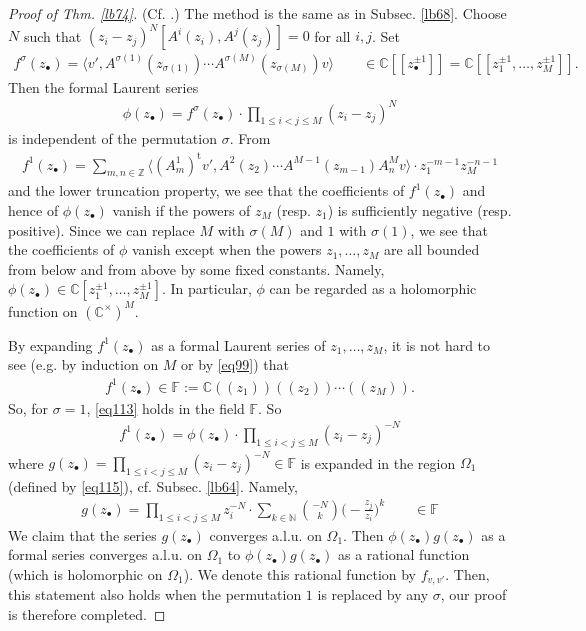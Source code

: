\documentclass[11pt,b5paper,notitlepage]{article}
\theoremstyle{definition}
\theoremstyle{plain}
\newcommand{\tr}{\mathrm{t}} %
\newcommand{\bk}[1]{\langle {#1}\rangle}
\newcommand{\bigbk}[1]{\big\langle {#1}\big\rangle}
\newcommand{\mbb}{\mathbb}
\newcommand{\blt}{\bullet}
\newcommand{\Cbb}{\mathbb C}
\newcommand{\Nbb}{\mathbb N}
\newcommand{\Zbb}{\mathbb Z}
\numberwithin{equation}{section}
\begin{document}
\begin{proof}[Proof of Thm. \ref{lb74}] (Cf. \cite{FHL93}.)
The method is the same as in Subsec. \ref{lb68}. Choose $N$ such that $(z_i-z_j)^N[A^i(z_i),A^j(z_j)]=0$ for all $i,j$. Set
\begin{align}
f^\sigma(z_\blt)=\bigbk{v',A^{\sigma(1)}(z_{\sigma(1)})\cdots A^{\sigma(M)}(z_{\sigma(M)})v}\qquad\in\Cbb[[z_\blt^{\pm1}]]=\Cbb[[z_1^{\pm1},\dots,z_M^{\pm1}]].	
\end{align}
Then the formal Laurent series
\begin{align}
\phi(z_\blt)=f^\sigma(z_\blt)	\cdot \prod_{1\leq i<j\leq M}(z_i-z_j)^N\label{eq113}
\end{align}
is independent of the permutation $\sigma$. From
\begin{align*}
f^1(z_\blt)=\sum_{m,n\in\Zbb}\bk{(A^1_m)^\tr v',A^2(z_2)\cdots A^{M-1}(z_{m-1})A^M_nv}\cdot z_1^{-m-1}z_M^{-n-1}
\end{align*}
and the lower truncation property, we see that the coefficients of $f^1(z_\blt)$ and hence of $\phi(z_\blt)$ vanish if the powers of $z_M$ (resp. $z_1$) is sufficiently negative (resp. positive). Since we can replace $M$ with $\sigma(M)$ and $1$ with $\sigma(1)$, we see that the coefficients of $\phi$ vanish except when the powers $z_1,\dots,z_M$ are all bounded from below and from above by some fixed constants. Namely, $\phi(z_\blt)\in\Cbb[z_1^{\pm1},\dots,z_M^{\pm1}]$. In particular, $\phi$ can be regarded as a holomorphic function on $(\Cbb^\times)^M$.

By expanding $f^1(z_\blt)$ as a formal Laurent series of $z_1,\dots,z_M$, it is not hard to see (e.g. by induction on $M$ or by \eqref{eq99}) that
\begin{align}
	f^1(z_\blt)\in\mbb F:=\Cbb((z_1))((z_2))\cdots((z_M)).
\end{align}
So, for $\sigma=1$, \eqref{eq113} holds in the field $\mbb F$. So
\begin{align}
f^1(z_\blt)=\phi(z_\blt)\cdot\prod_{1\leq i<j\leq M}(z_i-z_j)^{-N}	\label{eq114}
\end{align}
where $g(z_\blt)=\prod_{1\leq i<j\leq M}(z_i-z_j)^{-N}\in\mbb F$ is expanded in the region $\Omega_1$ (defined by \eqref{eq115}), cf. Subsec. \ref{lb64}. Namely,
\begin{align*}
g(z_\blt)=\prod_{1\leq i<j\leq M}z_i^{-N}\cdot \sum_{k\in\Nbb}{-N\choose k}\Big(-\frac{z_j}{z_i}\Big)^k\qquad\in\mbb F
\end{align*}
We claim that the series $g(z_\blt)$ converges a.l.u. on $\Omega_1$. Then $\phi(z_\blt)g(z_\blt)$ as a formal series converges a.l.u. on $\Omega_1$ to $\phi(z_\blt)g(z_\blt)$ as a rational function (which is holomorphic on $\Omega_1$). We denote this rational function by $f_{v,v'}$. Then, this statement also holds when the permutation $1$ is replaced by any $\sigma$, our proof is therefore completed.


\end{proof}
\end{document}
